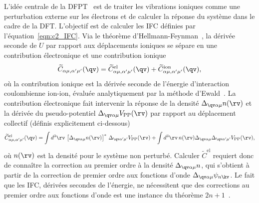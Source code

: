 L'idée centrale de la DFPT~\cite{baroniPhononsRelatedCrystal2001a,baroniGreensfunctionApproachLinear1987,gonzeDensityfunctionalApproachNonlinearresponse1989,savrasovLinearresponseTheoryLattice1996} est de traiter les vibrations ioniques comme une perturbation externe sur les électrons et de calculer la réponse du système dans le cadre de la DFT. L'objectif est de calculer les IFC définies par l'équation~\eqref{eqn:c2_IFC}. Via le théorème d'Hellmann-Feynman~\cite{EinfuhrungQuantenchemieHellmann1941,feynmanForcesMolecules1939}, la dérivée seconde de $U$ par rapport aux déplacements ioniques se sépare en une contribution électronique et une contribution ionique
\begin{equation}
    \widetilde{C}_{\alpha\mu,\alpha'\mu'}(\qv) = \widetilde{C}^\text{el}_{\alpha\mu,\alpha'\mu'}(\qv) + \widetilde{C}^{\text{ion}}_{\alpha\mu,\alpha'\mu'}(\qv),
    \label{eqn:IFCq}
\end{equation}
où la contribution ionique est la dérivée seconde de l'énergie d'interaction coulombienne ion-ion, évaluée analytiquement par la méthode d'Ewald~\cite{ewaldBerechnungOptischerUnd1921}. La contribution électronique fait intervenir la réponse de la densité $\Delta_{\qv\alpha\mu}n(\rv)$ et la dérivée du pseudo-potentiel $\Delta_{\qv\alpha\mu}V_\text{PP}(\rv)$ par rapport au déplacement collectif (définis explicitement ci-dessous)
\begin{equation}
    \widetilde{C}^{\text{el}}_{\alpha\mu,\alpha'\mu'}(\qv) = \int d^3\rv\, \left[\Delta_{\qv\alpha\mu}n(\rv)\right]^*\,\Delta_{\qv\alpha'\mu'} V_\text{PP}(\rv)+\int d^3\rv\,n(\rv)\Delta_{\qv\alpha\mu}\Delta_{\qv\alpha'\mu'}V_\text{PP}(\rv)
    ,\label{eqn:C_el}
\end{equation}
où $n(\rv)$ est la densité pour le système non perturbé. Calculer $\widetilde{C}^\text{el}$ requiert donc de connaître la correction au premier ordre à la densité $\Delta_{\qv\alpha\mu}n$, qui s'obtient à partir de la correction de premier ordre aux fonctions d'onde $\Delta_{\qv\alpha\mu}\psi_{n\kv}$. Le fait que les IFC,  dérivées secondes de l'énergie, ne nécessitent que des corrections au premier ordre aux fonctions d'onde est une instance du théorème $2n+1$~\cite{dalgarnoPerturbationCalculationProperties1958,gonzeDensityfunctionalApproachNonlinearresponse1989,gonzeAdiabaticDensityfunctionalPerturbation1995,baroniPhononsRelatedCrystal2001a}. 


